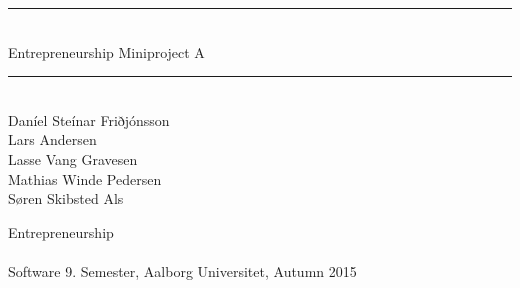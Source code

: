 %
%
%
%
% 



\begin{titlepage}
\begin{center}
\newcommand{\HRule}{\rule{\linewidth}{0.5mm}}
\HRule \\[0.4cm]
\Huge Entrepreneurship Miniproject A \\[0.3cm]

\HRule \\[1cm]
\noindent
  {\small
  Daníel Steínar Friðjónsson\\
  Lars Andersen\\
  Lasse Vang Gravesen\\
  Mathias Winde Pedersen\\
  Søren Skibsted Als\\}

\vfill
{\Large Entrepreneurship}
\\ ~\\
{\large Software 9. Semester, Aalborg Universitet, Autumn 2015}

\end{center}
\end{titlepage}

\pagestyle{empty} %
%

\pagestyle{fancy} %
\setcounter{tocdepth}{1}
%






\label{bib:mybiblio}

\appendix
%



